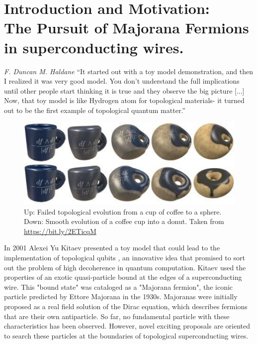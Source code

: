 \chapter{ \label{chap:Motivation}  Introduction and Motivation: \\ The Pursuit of Majorana Fermions in superconducting wires. }

\setcounter{page}{1}

\begin{chapquote}{\textit{F. Duncan M. Haldane}}
``It started out with a toy model demonstration, and then I realized it was very good model.  You don't understand the full implications until other people start thinking it is true and they observe the big picture [...] Now, that toy model is like Hydrogen atom for topological materials- it turned out to be the first example of topological quantum matter.''
\end{chapquote}
\begin{figure}[b]
  \centering
  \includegraphics[scale = 0.5]{IMAGES/Majorana/Coffe&donuts.jpg}
  \caption{Up: Failed topological evolution from a cup of coffee to a sphere. Down: Smooth evolution of a coffee cup into a donut. \label{fig:Coffe}Taken from \url{https://bit.ly/2ETicqM} }
\end{figure}


In 2001 Alexei Yu Kitaev presented a toy model that could lead to the implementation of topological qubits \citep{kitaev_unpaired_2001}, an innovative idea that promised to sort out the problem of high decoherence in quantum computation. Kitaev used the properties of an exotic quasi-particle bound at the edges of a superconducting wire. This "bound state" was cataloged as a "Majorana fermion", the iconic particle predicted by Ettore Majorana in the 1930s. Majoranas were initially proposed as a real field solution of the Dirac equation, which describes fermions that are their own antiparticle\citep{wilczek_majorana_2009}.  So far, no fundamental particle with these characteristics has been observed. However, novel exciting  proposals are oriented to search these particles at the boundaries of topological superconducting wires. 



